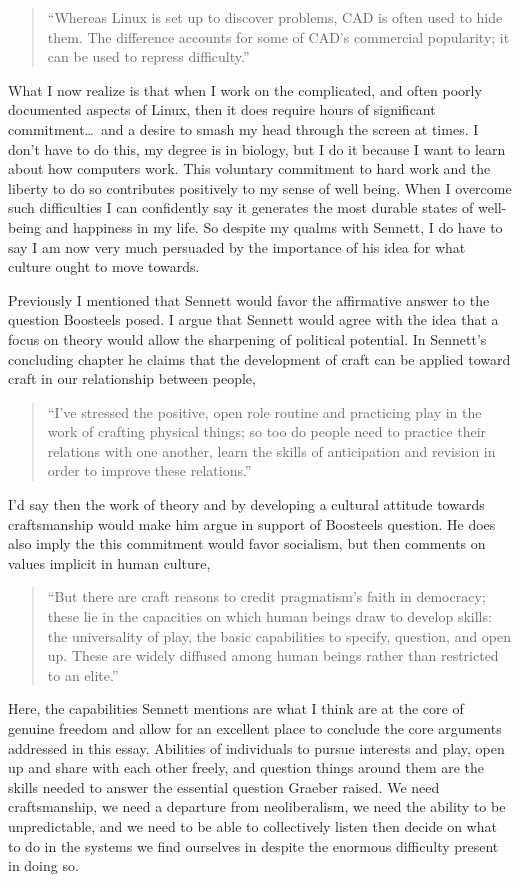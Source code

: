 \documentclass[12pt,a4paper]{article}
\begin{document}
\begin{quote}\color{G-Moon}
   ``Whereas Linux is set up to discover problems, CAD is often used to hide them. The difference accounts for some of CAD’s commercial popularity; it can be used to repress difficulty.''~\cite{craft}
\end{quote}
What I now realize is that when I work on the complicated, and often poorly documented aspects of Linux, then it does require hours of significant commitment\ldots~and a desire to smash my head through the screen at times. I don't have to do this, my degree is in biology, but I do it because I want to learn about how computers work. This voluntary commitment to hard work and the liberty to do so contributes positively to my sense of well being. When I overcome such difficulties I can confidently say it generates the most durable states of well-being and happiness in my life. So despite my qualms with Sennett, I do have to say I am now very much persuaded by the importance of his idea for what culture ought to move towards.

Previously I mentioned that Sennett would favor the affirmative answer to the question Boosteels posed. I argue that Sennett would agree with the idea that a focus on theory would allow the sharpening of political potential. In Sennett's concluding chapter he claims that the development of craft can be applied toward craft in our relationship between people,
\begin{quote}\color{G-Moon}
   ``I’ve stressed the positive, open role 
routine and practicing play in the work of crafting physical 
things; so too do people need to practice their relations 
with one another, learn the skills of anticipation and 
revision in order to improve these relations.''~\cite{craft}
\end{quote}
I'd say then the work of theory and by developing a cultural attitude towards craftsmanship would make him argue in support of Boosteels question. He does also imply the this commitment would favor socialism, but then comments on values implicit in human culture,
\begin{quote}\color{G-Moon}
``But there are craft reasons to credit pragmatism’s faith in democracy; 
these lie in the capacities on which human beings draw to 
develop skills: the universality of play, the basic 
capabilities to specify, question, and open up. These are 
widely diffused among human beings rather than restricted 
to an elite.''~\cite{craft}
\end{quote}
Here, the capabilities Sennett mentions are what I think are at the core of genuine freedom and allow for an excellent place to conclude the core arguments addressed in this essay. Abilities of individuals to pursue interests and play, open up and share with each other freely, and question things around them are the skills needed to answer the essential question Graeber raised. We need craftsmanship, we need a departure from neoliberalism, we need the ability to be unpredictable, and we need to be able to collectively listen then decide  on what to do in the systems we find ourselves in despite the enormous difficulty present in doing so. 
\clearpage


\end{document}
